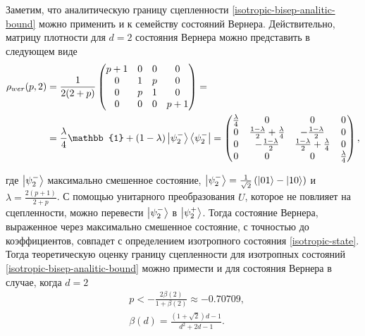 Заметим, что аналитическую границу сцепленности \ref{isotropic-bisep-analitic-bound} можно применить и к семейству состояний Вернера.
Действительно, матрицу плотности для $d=2$ состояния Вернера можно представить в следующем виде
\begin{equation}
\begin{split}
    \rho_{wer}(p, 2) & = 
    \frac{1}{2(2 + p)}
    \begin{pmatrix}
        p+1 & 0 & 0 & 0 \\
        0 & 1 & p & 0 \\
        0 & p & 1 & 0 \\
        0 & 0 & 0 & p+1 \\
    \end{pmatrix}
     = \\
    &= \frac{\lambda}{4} \mathbb{1} + (1-\lambda)\ket{\psi^{-}_2} \bra{\psi^{-}_2}
     =
    \begin{pmatrix}
        \frac{\lambda}{4} & 0 & 0 & 0 \\
        0 & \frac{1-\lambda}{2} + \frac{\lambda}{4} & -\frac{1-\lambda}{2} & 0 \\
        0 & -\frac{1-\lambda}{2} & \frac{1-\lambda}{2} + \frac{\lambda}{4} & 0 \\
        0 & 0 & 0 & \frac{\lambda}{4} \\
    \end{pmatrix}, \\
\end{split}
\end{equation}

где $\ket{\psi^{-}_2}$ максимально смешенное состояние, $\ket{\psi^{-}_2} = \frac{1}{\sqrt{2}} \left( \ket{01} - \ket{10} \right)$ и $\lambda = \frac{2(p+1)}{2 + p}$.
С помощью унитарного преобразования $U$, которое не повлияет на сцепленности, можно перевести $\ket{\psi^{-}_2}$ в $\ket{\psi^{+}_2}$.
Тогда состояние Вернера, выраженное через максимально смешенное состояние, с точностью до коэффициентов, совпадет с 
 определением изотропного состояния \ref{isotropic-state}.
 Тогда теоретическую оценку границу сцепленности для изотропных состояний \ref{isotropic-bisep-analitic-bound} 
 можно примести и для состояния Вернера в случае, когда $d=2$
 \begin{equation}\label{werner-sep-2d-analytic-bound}
 \begin{split}
     & p < -\frac{2\beta(2)}{1 + \beta(2)} \approx -0.70709, \\
     & \beta(d) = \frac{(1 + \sqrt{2})d - 1}{d^2 + 2d - 1}.
 \end{split}
 \end{equation}

